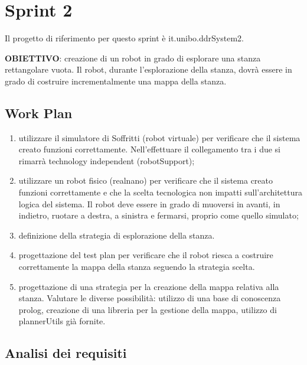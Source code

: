 \newpage

\section{Sprint 2} 

Il progetto di riferimento per questo sprint è it.unibo.ddrSystem2.

\textbf{OBIETTIVO}: creazione di un robot in grado di esplorare una stanza rettangolare vuota. Il robot, durante l'esplorazione della stanza, dovrà essere in grado di costruire incrementalmente una mappa della stanza.

\subsection{Work Plan}

\begin{enumerate}
    \item utilizzare il simulatore di Soffritti (robot virtuale) per verificare che il sistema creato funzioni correttamente. Nell'effettuare il collegamento tra i due si rimarrà technology independent (robotSupport);
    
    \item utilizzare un robot fisico (realnano) per verificare che il sistema creato funzioni correttamente e che la scelta tecnologica non impatti sull'architettura logica del sistema. Il robot deve essere in grado di muoversi in avanti, in indietro, ruotare a destra, a sinistra e fermarsi, proprio come quello simulato;
    
    \item definizione della strategia di esplorazione della stanza.
    
    \item progettazione del test plan per verificare che il robot riesca a costruire correttamente la mappa della stanza seguendo la strategia scelta.
       
    \item progettazione di una strategia per la creazione della mappa relativa alla stanza. Valutare le diverse possibilità: utilizzo di una base di conoscenza prolog, creazione di una libreria per la gestione della mappa, utilizzo di plannerUtils già fornite. 
 
\end{enumerate}{}


\subsection{Analisi dei requisiti}

